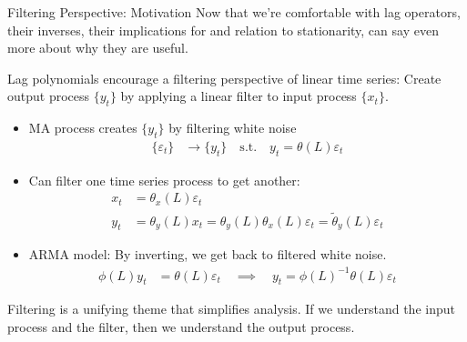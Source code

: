 \documentclass[aspectratio=169, handout]{beamer}
\newcommand{\ra}{\rightarrow}
\begin{document}
{\scriptsize
\begin{frame}{Filtering Perspective: Motivation}
Now that we're comfortable with lag operators, their inverses, their
implications for and relation to stationarity, can say even more about
why they are useful.

Lag polynomials encourage a \alert{filtering} perspective of linear time
series:
Create output process $\{y_t\}$ by applying a linear filter to input
process $\{x_t\}$.
\begin{itemize}
  \item MA process creates $\{y_t\}$ by filtering white
    noise
    \begin{align*}
      \{\varepsilon_t\} &\ra \{y_t\}
      \quad\text{s.t.}\quad
      y_t
      =
      \theta(L)\varepsilon_t
    \end{align*}

  \pause
  \item
    Can filter one time series process to get another:
    \begin{align*}
      x_t &= \theta_x(L)\varepsilon_t
      \\
      y_t &= \theta_y(L)x_t
      = \theta_y(L)\theta_x(L)\varepsilon_t
      = \tilde{\theta}_y(L)\varepsilon_t
    \end{align*}

  \pause
  \item
    ARMA model: By inverting,
    we get back to filtered white noise.
    \begin{align*}
      \phi(L)y_t &= \theta(L)\varepsilon_t
      \quad\implies\quad
      y_t = \phi(L)^{-1}\theta(L)\varepsilon_t
    \end{align*}
\end{itemize}
Filtering is a \alert{unifying} theme that simplifies analysis.
If we understand the input process and the filter, then we understand
the output process.
\end{frame}
}
\end{document}
